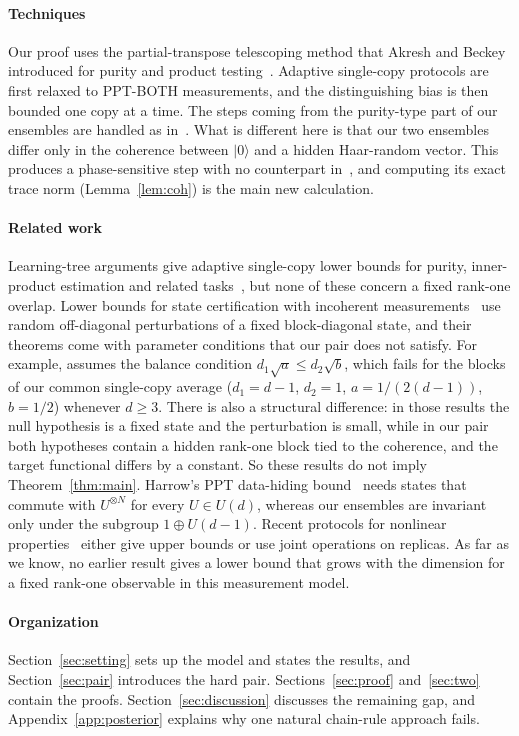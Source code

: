 \documentclass[pdflatex,sn-mathphys-num]{sn-jnl}%
\theoremstyle{thmstyleone}
\theoremstyle{thmstylethree}
\theoremstyle{thmstyletwo}
\newcommand{\ket}[1]{|#1\rangle}
\begin{document}
\paragraph{Techniques} Our proof uses the partial-transpose telescoping method that Akresh and Beckey introduced for
purity and product testing~\cite{ab}. Adaptive single-copy protocols are first relaxed to PPT-BOTH measurements, and the
distinguishing bias is then bounded one copy at a time. The steps coming from the purity-type part of our ensembles are
handled as in~\cite{ab}. What is different here is that our two ensembles differ only in the coherence between $\ket0$
and a hidden Haar-random vector. This produces a phase-sensitive step with no counterpart in~\cite{ab}, and computing
its exact trace norm (Lemma~\ref{lem:coh}) is the main new calculation.

\paragraph{Related work} Learning-tree arguments give adaptive single-copy lower bounds for purity, inner-product
estimation and related tasks~\cite{cchl,lgdc,ghyz}, but none of these concern a fixed rank-one overlap. Lower bounds for
state certification with incoherent measurements~\cite{chll,clo} use random off-diagonal perturbations of a fixed
block-diagonal state, and their theorems come with parameter conditions that our pair does not satisfy. For example,
\cite[Thm.~7.3]{chll} assumes the balance condition $d_1\sqrt a\le d_2\sqrt b$, which fails for the blocks of our
common single-copy average ($d_1=d-1$, $d_2=1$, $a=1/(2(d-1))$, $b=1/2$) whenever $d\ge3$. There is also a structural
difference: in those results the null hypothesis is a fixed state and the perturbation is small, while in our pair both
hypotheses contain a hidden rank-one block tied to the coherence, and the target functional differs by a constant. So
these results do not imply Theorem~\ref{thm:main}. Harrow's PPT data-hiding bound~\cite[Thm.~7]{harrow23} needs states
that commute with $U^{\otimes N}$ for every $U\in U(d)$, whereas our ensembles are invariant only under the subgroup
$1\oplus U(d-1)$. Recent protocols for nonlinear properties~\cite{li26,afrs,cwyz} either give upper bounds or use joint
operations on replicas. As far as we know, no earlier result gives a lower bound that grows with the dimension for a
fixed rank-one observable in this measurement model.

\paragraph{Organization} Section~\ref{sec:setting} sets up the model and states the results, and
Section~\ref{sec:pair} introduces the hard pair. Sections~\ref{sec:proof} and~\ref{sec:two} contain the proofs.
Section~\ref{sec:discussion} discusses the remaining gap, and Appendix~\ref{app:posterior} explains why one natural
chain-rule approach fails.
\end{document}
